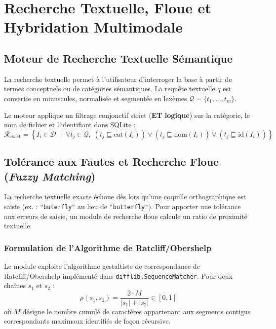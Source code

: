 \chapter{Recherche Textuelle, Floue et Hybridation Multimodale}
\label{chap:recherche_multimodale}

\section{Moteur de Recherche Textuelle Sémantique}

La recherche textuelle permet à l'utilisateur d'interroger la base à partir de termes conceptuels ou de catégories sémantiques. La requête textuelle $q$ est convertie en minuscules, normalisée et segmentée en lexèmes $\mathcal{Q} = \{t_1, \dots, t_m\}$.

Le moteur applique un filtrage conjonctif strict (\textbf{ET logique}) sur la catégorie, le nom de fichier et l'identifiant dans SQLite :
\begin{equation}
    \mathcal{R}_{\text{exact}} = \left\{ I_i \in \mathcal{D} \;\middle|\; \forall t_j \in \mathcal{Q}, \; (t_j \sqsubseteq \text{cat}(I_i)) \lor (t_j \sqsubseteq \text{nom}(I_i)) \lor (t_j \sqsubseteq \text{id}(I_i)) \right\}
\end{equation}

\section{Tolérance aux Fautes et Recherche Floue (\textit{Fuzzy Matching})}

La recherche textuelle exacte échoue dès lors qu'une coquille orthographique est saisie (ex. : \texttt{"buterfly"} au lieu de \texttt{"butterfly"}). Pour apporter une tolérance aux erreurs de saisie, un module de recherche floue calcule un ratio de proximité textuelle.

\subsection{Formulation de l'Algorithme de Ratcliff/Obershelp}
Le module exploite l'algorithme gestaltiste de correspondance de Ratcliff/Obershelp \cite{ratcliff1988} implémenté dans \texttt{difflib.SequenceMatcher}. Pour deux chaînes $s_1$ et $s_2$ :
\begin{equation}
    \rho(s_1, s_2) = \frac{2 \cdot M}{|s_1| + |s_2|} \in [0, 1]
    \label{eq:ratcliff_formule}
\end{equation}
où $M$ désigne le nombre cumulé de caractères appartenant aux segments contigus correspondants maximaux identifiés de façon récursive.

